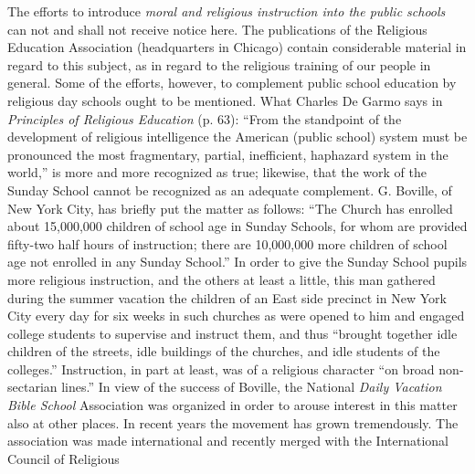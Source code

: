 The efforts to introduce \emph{moral and religious instruction into the public schools} can not and shall not receive notice here. The publications of the Religious Education Association (headquarters in Chicago) contain considerable material in regard to this subject, as in regard to the religious training of our people in general. Some of the efforts, however, to complement public school education by religious day schools ought to be mentioned. What Charles De Garmo says in \emph{Principles of Religious Education} (p. 63): “From the standpoint of the development of religious intelligence the American (public school) system must be pronounced the most fragmentary, partial, inefficient, haphazard system in the world,” is more and more recognized as true; likewise, that the work of the Sunday School cannot be recognized as an adequate complement. G. Boville, of New York City, has briefly put the matter as follows: “The Church has enrolled about 15,000,000 children of school age in Sunday Schools, for whom are provided fifty-two half hours of instruction; there are 10,000,000 more children of school age not enrolled in any Sunday School.” In order to give the Sunday School pupils more religious instruction, and the others at least a little, this man gathered during the summer vacation the children of an East side precinct in New York City every day for six weeks in such churches as were opened to him and engaged college students to supervise and instruct them, and thus “brought together idle children of the streets, idle buildings of the churches, and idle students of the colleges.” Instruction, in part at least, was of a religious character “on broad non-sectarian lines.” In view of the success of Boville, the National \emph{Daily Vacation Bible School} Association was organized in order to arouse interest in this matter also at other places. In recent years the movement has grown tremendously. The association was made international and recently merged with the International Council of Religious
